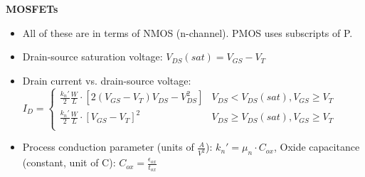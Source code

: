 \documentclass{article}
\begin{document}
\textbf{MOSFETs}
\begin{itemize}
    \item All of these are in terms of NMOS (n-channel). PMOS uses subscripts of P.
    \item Drain-source saturation voltage: $V_{DS}(sat) = V_{GS} - V_T$
    \item Drain current vs. drain-source voltage: $I_D = \begin{cases}
        \frac{k_n'}{2} \frac{W}{L} \cdot \left[2(V_{GS} - V_T) V_{DS} - V_{DS}^2\right] & V_{DS} < V_{DS}(sat), V_{GS} \geq V_T \\
        \frac{k_n'}{2} \frac{W}{L} \cdot \left[V_{GS} - V_T\right]^2 & V_{DS} \geq V_{DS}(sat), V_{GS} \geq V_T \\
    \end{cases}$
    \item Process conduction parameter (units of $\frac{A}{V^2}$): $k_n' = \mu_n \cdot C_{ox}$, Oxide capacitance (constant, unit of C): $C_{ox} = \frac{\epsilon_{ox}}{t_{ox}}$
\end{itemize}
\end{document}
